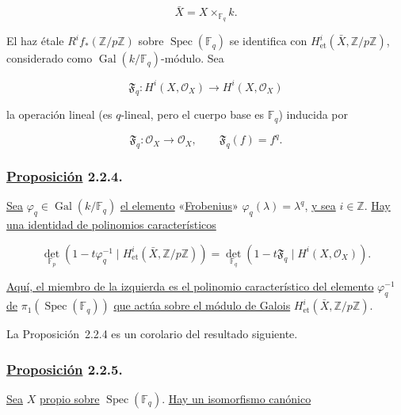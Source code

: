\begin{equation}\tag{2.2.1}
\bar X=X\times_{\mathbb F_q}k.
\end{equation}

El haz étale $R^if_*(\mathbb Z/p\mathbb Z)$ sobre
$\operatorname{Spec}(\mathbb F_q)$ se identifica con
$H^i_{\mathrm{et}}(\bar X,\mathbb Z/p\mathbb Z)$, considerado como
$\operatorname{Gal}(k/\mathbb F_q)$-módulo. Sea

\begin{equation}\tag{2.2.2}
\mathfrak F_q:H^i(X,\mathcal O_X)\longrightarrow H^i(X,\mathcal O_X)
\end{equation}

la operación lineal (es $q$-lineal, pero el cuerpo base es
$\mathbb F_q$) inducida por

\begin{equation}\tag{2.2.3}
\mathfrak F_q:\mathcal O_X\longrightarrow\mathcal O_X,
\qquad \mathfrak F_q(f)=f^q.
\end{equation}

\subsubsection*{\underline{Proposición} 2.2.4.}
\underline{Sea} $\varphi_q\in\operatorname{Gal}(k/\mathbb F_q)$ \underline{el elemento} «\underline{Frobenius}»
$\varphi_q(\lambda)=\lambda^q$, \underline{y sea} $i\in\mathbb Z$. \underline{Hay una identidad
de polinomios característicos}

\begin{equation}\tag{2.2.4.1}
\det_{\mathbb F_p}\!\left(
1-t\varphi_q^{-1}\mid H^i_{\mathrm{et}}(\bar X,\mathbb Z/p\mathbb Z)
\right)
=
\det_{\mathbb F_q}\!\left(
1-t\mathfrak F_q\mid H^i(X,\mathcal O_X)
\right).
\end{equation}

\underline{Aquí, el miembro de la izquierda es el polinomio característico del
elemento} $\varphi_q^{-1}$ \underline{de} $\pi_1(\operatorname{Spec}(\mathbb F_q))$ \underline{que actúa sobre
el módulo de Galois}
$H^i_{\mathrm{et}}(\bar X,\mathbb Z/p\mathbb Z)$.

La Proposición~2.2.4 es un corolario del resultado siguiente.

\pageoriginale

\subsubsection*{\underline{Proposición} 2.2.5.}
\underline{Sea} $X$ \underline{propio sobre} $\operatorname{Spec}(\mathbb F_q)$. \underline{Hay un isomorfismo canónico}

